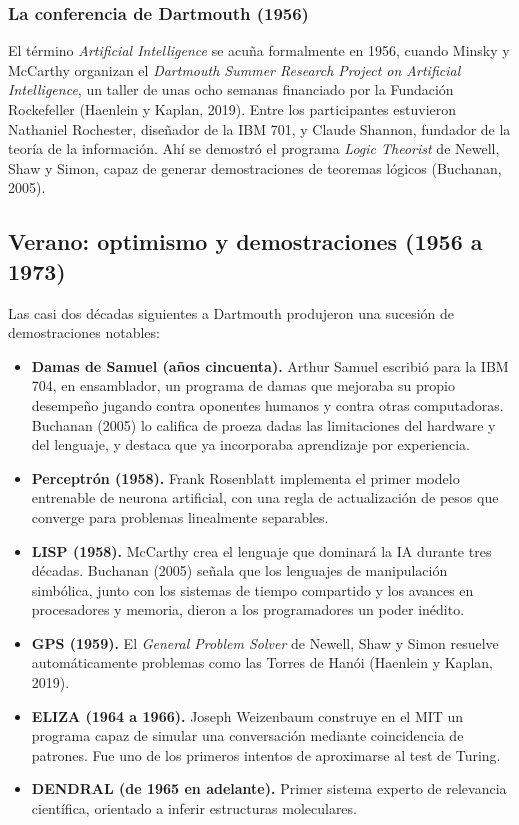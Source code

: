 \documentclass[12pt,letterpaper,oneside]{article}
\begin{document}
\subsubsection{La conferencia de Dartmouth (1956)}

El término \textit{Artificial Intelligence} se acuña formalmente en 1956, cuando Minsky y McCarthy organizan el \textit{Dartmouth Summer Research Project on Artificial Intelligence}, un taller de unas ocho semanas financiado por la Fundación Rockefeller (Haenlein y Kaplan, 2019). Entre los participantes estuvieron Nathaniel Rochester, diseñador de la IBM 701, y Claude Shannon, fundador de la teoría de la información. Ahí se demostró el programa \textit{Logic Theorist} de Newell, Shaw y Simon, capaz de generar demostraciones de teoremas lógicos (Buchanan, 2005).

\subsection{Verano: optimismo y demostraciones (1956 a 1973)}

Las casi dos décadas siguientes a Dartmouth produjeron una sucesión de demostraciones notables:

\begin{itemize}[leftmargin=1.4cm,itemsep=0.25em]
  \item \textbf{Damas de Samuel (años cincuenta).} Arthur Samuel escribió para la IBM 704, en ensamblador, un programa de damas que mejoraba su propio desempeño jugando contra oponentes humanos y contra otras computadoras. Buchanan (2005) lo califica de proeza dadas las limitaciones del hardware y del lenguaje, y destaca que ya incorporaba aprendizaje por experiencia.
  \item \textbf{Perceptrón (1958).} Frank Rosenblatt implementa el primer modelo entrenable de neurona artificial, con una regla de actualización de pesos que converge para problemas linealmente separables.
  \item \textbf{LISP (1958).} McCarthy crea el lenguaje que dominará la IA durante tres décadas. Buchanan (2005) señala que los lenguajes de manipulación simbólica, junto con los sistemas de tiempo compartido y los avances en procesadores y memoria, dieron a los programadores un poder inédito.
  \item \textbf{GPS (1959).} El \textit{General Problem Solver} de Newell, Shaw y Simon resuelve automáticamente problemas como las Torres de Hanói (Haenlein y Kaplan, 2019).
  \item \textbf{ELIZA (1964 a 1966).} Joseph Weizenbaum construye en el MIT un programa capaz de simular una conversación mediante coincidencia de patrones. Fue uno de los primeros intentos de aproximarse al test de Turing.
  \item \textbf{DENDRAL (de 1965 en adelante).} Primer sistema experto de relevancia científica, orientado a inferir estructuras moleculares.
\end{itemize}
\end{document}
